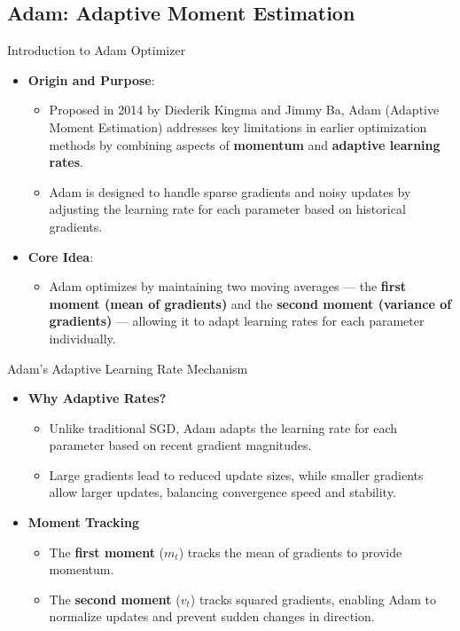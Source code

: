 \documentclass[serif, aspectratio=169]{beamer}
\begin{document}
\subsection{Adam: Adaptive Moment Estimation}
\begin{frame}{Introduction to Adam Optimizer}
    \begin{itemize}
        \item \textbf{Origin and Purpose}: 
        \begin{itemize}
            \item Proposed in 2014 by Diederik Kingma and Jimmy Ba, Adam (Adaptive Moment Estimation) addresses key limitations in earlier optimization methods by combining aspects of \textbf{momentum} and \textbf{adaptive learning rates}.
            \item Adam is designed to handle sparse gradients and noisy updates by adjusting the learning rate for each parameter based on historical gradients.
        \end{itemize}
        \item \textbf{Core Idea}:
        \begin{itemize}
            \item Adam optimizes by maintaining two moving averages — the \textbf{first moment (mean of gradients)} and the \textbf{second moment (variance of gradients)} — allowing it to adapt learning rates for each parameter individually.
        \end{itemize}
    \end{itemize}
\end{frame}

\begin{frame}{Adam’s Adaptive Learning Rate Mechanism}
    \begin{itemize}
        \item \textbf{Why Adaptive Rates?}
        \begin{itemize}
            \item Unlike traditional SGD, Adam adapts the learning rate for each parameter based on recent gradient magnitudes.
            \item Large gradients lead to reduced update sizes, while smaller gradients allow larger updates, balancing convergence speed and stability.
        \end{itemize}
        \item \textbf{Moment Tracking}
        \begin{itemize}
            \item The \textbf{first moment} ($m_t$) tracks the mean of gradients to provide momentum.
            \item The \textbf{second moment} ($v_t$) tracks squared gradients, enabling Adam to normalize updates and prevent sudden changes in direction.
        \end{itemize}
    \end{itemize}
\end{frame}
\end{document}
